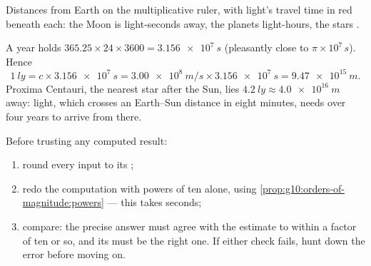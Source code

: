 \begin{omfigure}

{\small Distances from Earth on the multiplicative ruler, with light's
travel time in red beneath each: the Moon is light-seconds away, the
planets light-hours, the stars .}
\end{omfigure}

\begin{example}\label{ex:g10:orders-of-magnitude:ly}
A year holds $365.25 \times 24 \times 3600 = \qty{3.156e7}{s}$
(pleasantly close to $\pi \times 10^{7}\,\unit{s}$). Hence
\[
\qty{1}{ly} = c \times \qty{3.156e7}{s}
= \qty{3.00e8}{m/s} \times \qty{3.156e7}{s}
= \qty{9.47e15}{m}.
\]
Proxima Centauri, the nearest star after the Sun, lies
$\qty{4.2}{ly} \approx \qty{4.0e16}{m}$ away: light, which crosses an
Earth--Sun distance in eight minutes, needs over four years to arrive
from there.
\end{example}

\begin{method}\label{met:g10:orders-of-magnitude:sanity}
Before trusting any computed result:
\begin{enumerate}
  \item round every input to its ;
  \item redo the computation with powers of ten alone, using
        \cref{prop:g10:orders-of-magnitude:powers} --- this takes
        seconds;
  \item compare: the precise answer must agree with the estimate to
        within a factor of ten or so, and its  must be the right
        one. If either check fails, hunt down the error before moving
        on.
\end{enumerate}
\end{method}

